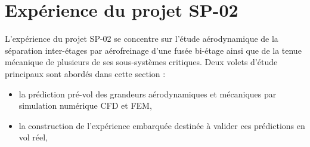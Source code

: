 \section{Expérience du projet SP-02}

L'expérience du projet SP-02 se concentre sur l'étude aérodynamique de la séparation inter-étages par aérofreinage d'une
fusée bi-étage ainsi que de la tenue mécanique de plusieurs de ses sous-systèmes critiques. Deux volets d'étude principaux
sont abordés dans cette section :
\begin{itemize}
    \item la prédiction pré-vol des grandeurs aérodynamiques et mécaniques par simulation numérique \acrshort{CFD} et
    \acrshort{FEM},
    \item la construction de l'expérience embarquée destinée à valider ces prédictions en vol réel,
\end{itemize} 





\newpage

